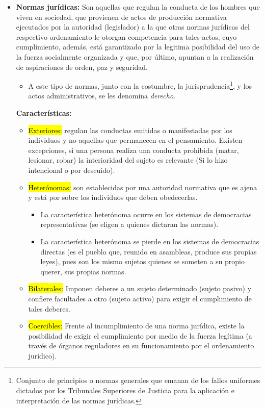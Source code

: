 \documentclass{templateApunte}
\newcommand{\hlcolor}[2]{{\sethlcolor{#1}\hl{#2}}}
\begin{document}
\begin{itemize}
  \item \textbf{Normas jurídicas:} Son aquellas que regulan la conducta de los hombres que viven en sociedad, que provienen de actos de producción normativa ejecutados por la autoridad (legislador) a la que otras normas jurídicas del respectivo ordenamiento le otorgan competencia para tales actos, cuyo cumplimiento, además, está garantizado por la legitima posibilidad del uso de la fuerza socialmente organizada y que, por último, apuntan a la realización de aspiraciones de orden, paz y seguridad.
  \begin{itemize}
    \item A este tipo de normas, junto con la costumbre, la jurisprudencia\footnote{Conjunto de principios o normas generales que emanan de los fallos uniformes dictados por los Tribunales Superiores de Justicia para la aplicación e interpretación de las normas jurídicas.}, y los actos administrativos, se les denomina \textit{derecho}.
  \end{itemize}
  
  \textbf{Características:}
  \begin{itemize}
    \item \hlcolor{Violeta!50}{Exteriores:} regulan las conductas emitidas o manifestadas por los individuos y no aquellas que permanecen en el pensamiento.
    Existen excepciones, si una persona realiza una conducta prohibida (matar, lesionar, robar) la interioridad del sujeto es relevante (Si lo hizo intencional o por descuido).
    
    \item \hlcolor{Violeta!50}{Heterónomas:} son establecidas por una autoridad normativa que es ajena y está por sobre los individuos que deben obedecerlas.
    \begin{itemize}
      \item La característica heterónoma ocurre en los sistemas de democracias \newline representativas (se eligen a quienes dictaran las normas). 
      \item La característica heterónoma se pierde en los sistemas de democracias directas (es el pueblo que, reunido en asambleas, produce sus propias leyes), pues son los mismo sujetos quienes se someten a su propio querer, sus propias normas.
    \end{itemize}

    \item \hlcolor{Violeta!50}{Bilaterales:} Imponen deberes a un sujeto determinado (sujeto pasivo) y confiere facultades a otro (sujeto activo) para exigir el cumplimiento de tales deberes.
    
    \item \hlcolor{Violeta!50}{Coercibles:} Frente al incumplimiento de una norma jurídica, existe la posibilidad de exigir el cumplimiento por medio de la fuerza legítima (a través de órganos reguladores en su funcionamiento por el ordenamiento jurídico).
  \end{itemize}
\end{itemize}
\end{document}
